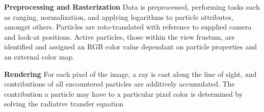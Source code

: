\documentclass[runningheads,a4paper]{llncs}
\begin{document}
\vskip 1pc
\noindent
\textbf{Preprocessing and Rasterization} 
   Data is preprocessed, performing tasks such as ranging, normalization, and applying logarithms to particle attributes, 
   amongst others. Particles are roto-translated with reference to supplied camera and look-at positions. Active particles, 
   those within the view frustum, are identified and assigned an RGB color value dependant on particle properties and an 
   external color map.  

\vskip 1pc
\noindent
\textbf{Rendering}
  For each pixel of the image, a ray is cast along the line of sight, and contributions of all encountered particles 
  are additively accumulated. The contribution a particle may have to a particular pixel color is determined by solving 
  the radiative transfer equation \cite{splotchgpu}





\end{document}
